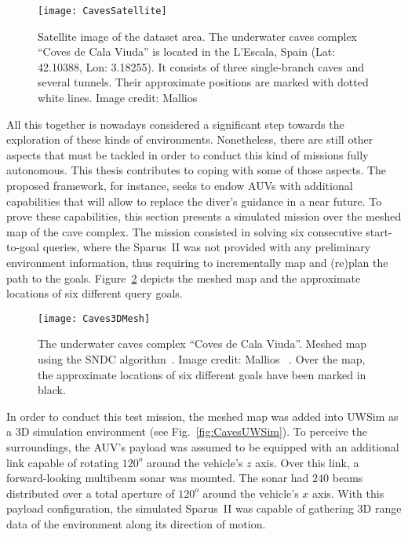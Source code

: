 \begin{figure}[htbp] %
\centering
	\texttt{[image: CavesSatellite]}
\caption[Satellite image of the underwater caves complex ``Coves de Cala
Viuda''.]
{Satellite image of the dataset area. The underwater caves complex ``Coves de
Cala Viuda'' is located in the L'Escala, Spain (Lat: 42.10388, Lon: 3.18255). It
consists of three single-branch caves and several tunnels. Their approximate
positions are marked with dotted white lines.
Image credit: Mallios ~\cite{Mallios2015, Mallios2017}}
\label{fig:CavesSatellite}
\end{figure}

All this together is nowadays considered a significant step towards the
exploration of these kinds of environments. Nonetheless, there are still other
aspects that must be tackled in order to conduct this kind of missions fully
autonomous. This thesis contributes to coping with some of those aspects. The
proposed framework, for instance, seeks to endow \acp{AUV} with additional
capabilities that will allow to replace the diver's guidance in a near future.
To prove these capabilities, this section presents a simulated mission over the
meshed map of the cave complex. The mission consisted in solving six consecutive
start-to-goal queries, where the Sparus~II was not provided with any preliminary
environment information, thus requiring to incrementally map and (re)plan the
path to the goals. Figure~\ref{fig:Caves3DMesh} depicts the meshed map and the
approximate locations of six different query goals.

\begin{figure}[htbp] %
\centering
	\texttt{[image: Caves3DMesh]}
\caption[The underwater caves complex ``Coves de Cala Viuda''. Meshed map
constructed using the SNDC algorithm.]
{The underwater caves complex ``Coves de Cala Viuda''. Meshed map using the SNDC
algorithm~\cite{Campos2013}. Image credit: Mallios ~\cite{Mallios2015}. Over the map, the approximate locations of six
different goals have been marked in black.}
\label{fig:Caves3DMesh}
\end{figure}

In order to conduct this test mission, the meshed map was added into \ac{UWSim}
as a \ac{3D} simulation environment (see Fig.~\ref{fig:CavesUWSim}). To perceive
the surroundings, the \ac{AUV}'s payload was assumed to be equipped with an
additional link capable of rotating $120^o$ around the vehicle's $z$ axis.
Over this link, a forward-looking multibeam sonar was mounted. The sonar had
$240$ beams distributed over a total aperture of $120^o$ around the vehicle's
$x$ axis. With this payload configuration, the simulated Sparus~II was capable
of gathering \ac{3D} range data of the environment along its direction of
motion.

